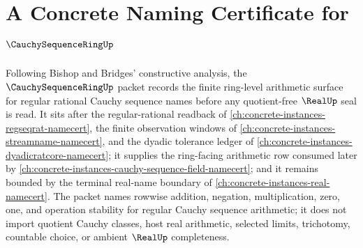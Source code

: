 \chapter{A Concrete Naming Certificate for $\CauchySequenceRingUp$}
\label{ch:concrete-instances-cauchy-sequence-ring-namecert}

Following Bishop and Bridges' constructive analysis, the $\CauchySequenceRingUp$ packet records the finite ring-level arithmetic surface for regular rational Cauchy sequence names before any quotient-free $\RealUp$ seal is read. It sits after the regular-rational readback of \autoref{ch:concrete-instances-regseqrat-namecert}, the finite observation windows of \autoref{ch:concrete-instances-streamname-namecert}, and the dyadic tolerance ledger of \autoref{ch:concrete-instances-dyadicratcore-namecert}; it supplies the ring-facing arithmetic row consumed later by \autoref{ch:concrete-instances-cauchy-sequence-field-namecert}; and it remains bounded by the terminal real-name boundary of \autoref{ch:concrete-instances-real-namecert}. The packet names rowwise addition, negation, multiplication, zero, one, and operation stability for regular Cauchy sequence arithmetic; it does not import quotient Cauchy classes, host real arithmetic, selected limits, trichotomy, countable choice, or ambient $\RealUp$ completeness.

